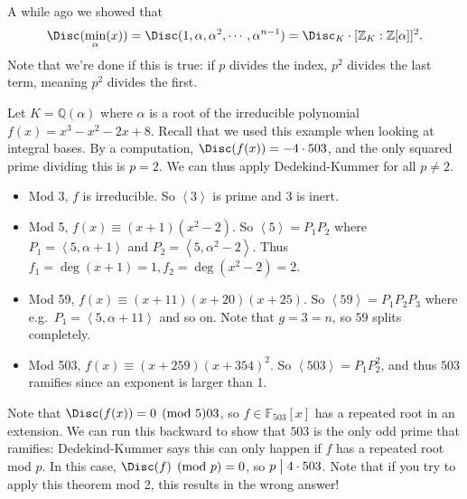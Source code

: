 \begin{remark}

A while ago we showed that
\begin{align*}
\Disc( \min_{ \alpha}(x)) = \Disc(1, \alpha, \alpha^2, \cdots , \alpha^{n-1}) = \Disc_K \cdot [{\mathbb{Z}}_K: {\mathbb{Z}}[ \alpha] ]^2
.\end{align*}
Note that we're done if this is true: if \(p\) divides the index,
\(p^2\) divides the last term, meaning \(p^2\) divides the first.

\end{remark}

\begin{example}[?]

Let \(K = {\mathbb{Q}}( \alpha)\) where \(\alpha\) is a root of the
irreducible polynomial \(f(x) = x^3 - x^2 - 2x + 8\). Recall that we
used this example when looking at integral bases. By a computation,
\(\Disc(f(x)) = -4 \cdot 503\), and the only squared prime dividing this
is \(p=2\). We can thus apply Dedekind-Kummer for all \(p\neq 2\).

\begin{itemize}
\item
  Mod 3, \(f\) is irreducible. So \(\left\langle{ 3 }\right\rangle\) is
  prime and \(3\) is inert.
\item
  Mod 5, \(f(x) \equiv (x+1)(x^2 - 2)\). So
  \(\left\langle{ 5 }\right\rangle= P_1 P_2\) where
  \(P_1 = \left\langle{ 5, \alpha+ 1 }\right\rangle\) and
  \(P_2 = \left\langle{ 5, \alpha^2 - 2 }\right\rangle\). Thus
  \(f_1 = \deg(x+1) = 1, f_2 = \deg(x^2 - 2) = 2\).
\item
  Mod 59, \(f(x) \equiv (x+11)(x+20)(x+25)\). So
  \(\left\langle{ 59 }\right\rangle = P_1 P_2 P_3\) where
  e.g.~\(P_1 = \left\langle{ 5, \alpha+ 11 }\right\rangle\) and so on.
  Note that \(g=3=n\), so \(59\) splits completely.
\item
  Mod 503, \(f(x) \equiv (x+259)(x+354)^2\). So
  \(\left\langle{ 503 }\right\rangle= P_1 P_2^2\), and thus \(503\)
  ramifies since an exponent is larger than 1.
\end{itemize}

Note that \(\Disc(f(x)) = 0 \pmod 503\), so
\(f\in {\mathbb{F}}_{503}[x]\) has a repeated root in an extension. We
can run this backward to show that \(503\) is the only odd prime that
ramifies: Dedekind-Kummer says this can only happen if \(f\) has a
repeated root mod \(p\). In this case, \(\Disc(f) \pmod p = 0\), so
\(p\bigm|4\cdot 503\). Note that if you try to apply this theorem mod 2,
this results in the wrong answer!

\end{example}

